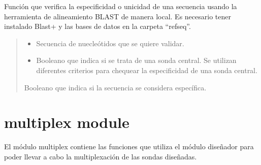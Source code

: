 \documentclass[letterpaper,10pt,spanish]{sphinxmanual}
\begin{document}
\begin{fulllineitems}
\label{\detokenize{diseno:diseno.verify_specificity}}
\pysigstartsignatures
{}
\pysigstopsignatures
\sphinxAtStartPar
Función que verifica la especificidad o unicidad de una secuencia usando la herramienta de alineamiento BLAST de manera local.
Es necesario tener instalado Blast+ y las bases de datos en la carpeta “refseq”.
\begin{quote}\begin{description}
\begin{itemize}
\item {} 
\sphinxAtStartPar
{} \textendash{} Secuencia de nuecleótidos que se quiere validar.

\item {} 
\sphinxAtStartPar
{} \textendash{} Booleano que indica si se trata de una sonda central. Se utilizan diferentes criterios para chequear la especificidad de una sonda central.

\end{itemize}

\sphinxAtStartPar
Booleano que indica si la secuencia se considera específica.

\end{description}\end{quote}

\end{fulllineitems}


\sphinxstepscope


\section{multiplex module}
\label{\detokenize{multiplex:multiplex-module}}\label{\detokenize{multiplex::doc}}
\sphinxAtStartPar
El módulo multiplex contiene las funciones que utiliza el módulo diseñador para poder llevar a cabo la multiplexación de las sondas diseñadas.
\label{\detokenize{multiplex:module-multiplex}}
\end{document}
